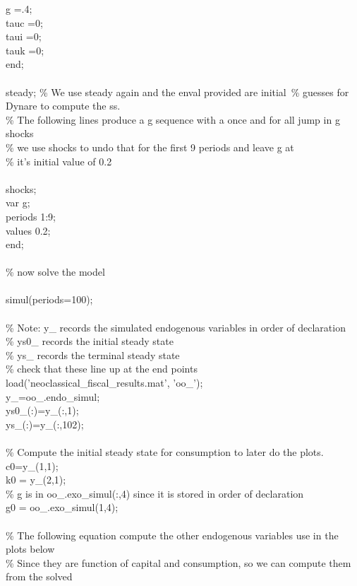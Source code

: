\documentclass[a4paper,12pt]{scrartcl} %
\begin{document}
{g =.4;\\
tauc =0;\\
taui =0;\\
tauk =0;\\
end;\\
\\
steady; \% We use steady again and the enval provided are initial\
\% guesses for Dynare to compute the ss.\\
\% The following lines produce a g sequence with a once and for all jump in g shocks\\
\% we use shocks to undo that for the first 9 periods and leave g at\\
\% it’s initial value of 0.2\\
\\
shocks;\\
var g;\\
periods 1:9;\\
values 0.2;\\
end;\\
\\
\% now solve the model\\
\\
simul(periods=100);\\
\\
\% Note: y\_ records the simulated endogenous variables in order of declaration\\
\% ys0\_ records the initial steady state\\
\% ys\_ records the terminal steady state\\
\% check that these line up at the end points\\
load('neoclassical\_fiscal\_results.mat', 'oo\_');\\
y\_=oo\_.endo\_simul;\\
ys0\_(:)=y\_(:,1);\\
ys\_(:)=y\_(:,102);\\
\\
\% Compute the initial steady state for consumption to later do the plots.\\
c0=y\_(1,1);\\
k0 = y\_(2,1);\\
\% g is in oo\_.exo\_simul(:,4) since it is stored in order of declaration\\
g0 = oo\_.exo\_simul(1,4);\\
\\
\% The following equation compute the other endogenous variables use in the plots below\\
\% Since they are function of capital and consumption, so we can compute them from the solved\\
}
\end{document}
